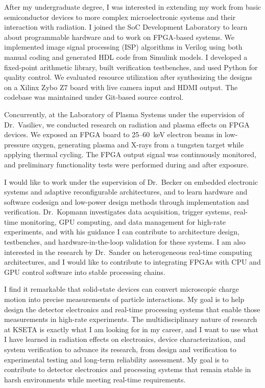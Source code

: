 \documentclass[a4paper,12pt]{article}
\begin{document}
After my undergraduate degree, I was interested in extending my work from basic semiconductor devices to more complex microelectronic systems and their interaction with radiation. I joined the SoC Development Laboratory to learn about programmable hardware and to work on FPGA-based systems. We implemented image signal processing (ISP) algorithms in Verilog using both manual coding and generated HDL code from Simulink models. I developed a fixed-point arithmetic library, built verification testbenches, and used Python for quality control. We evaluated resource utilization after synthesizing the designs on a Xilinx Zybo Z7 board with live camera input and HDMI output. The codebase was maintained under Git-based source control. 

Concurrently, at the Laboratory of Plasma Systems under the supervision of Dr.\ Vasiliev, we conducted research on radiation and plasma effects on FPGA devices. We exposed an FPGA board to 25--60~keV electron beams in low-pressure oxygen, generating plasma and X-rays from a tungsten target while applying thermal cycling. The FPGA output signal was continuously monitored, and preliminary functionality tests were performed during and after exposure.

I would like to work under the supervision of Dr.\ Becker on embedded electronic systems and adaptive reconfigurable architectures, and to learn hardware and software codesign and low-power design methods through implementation and verification. Dr.\ Kopmann investigates data acquisition, trigger systems, real-time monitoring, GPU computing, and data management for high-rate experiments, and with his guidance I can contribute to architecture design, testbenches, and hardware-in-the-loop validation for these systems. I am also interested in the research by Dr.\ Sander on heterogeneous real-time computing architectures, and I would like to contribute to integrating FPGAs with CPU and GPU control software into stable processing chains.

I find it remarkable that solid-state devices can convert microscopic charge motion into precise measurements of particle interactions. My goal is to help design the detector electronics and real-time processing systems that enable those measurements in high-rate experiments. The multidisciplinary nature of research at KSETA is exactly what I am looking for in my career, and I want to use what I have learned in radiation effects on electronics, device characterization, and system verification to advance its research, from design and verification to experimental testing and long-term reliability assessment. My goal is to contribute to detector electronics and processing systems that remain stable in harsh environments while meeting real-time requirements.
\end{document}
